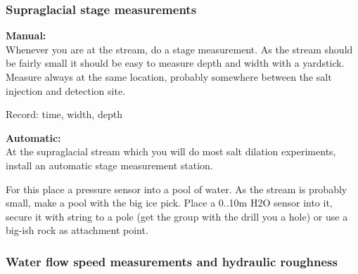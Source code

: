 \documentclass[DIV=15,halfparskip,11pt,headinclude]{scrartcl}
\begin{document}
\subsubsection{Supraglacial stage measurements}

\textbf{Manual:\\}
Whenever you are at the stream, do a stage measurement.  As the stream
should be fairly small it should be easy to measure depth and width
with a yardstick.  Measure always at the same location, probably
somewhere between the salt injection and detection site.

Record: time, width, depth

\textbf{Automatic:}\\
At the supraglacial stream which you will do most salt dilation
experiments, install an automatic stage measurement station.




For this place a pressure sensor into a pool of water.  As the stream
is probably small, make a pool with the big ice pick.  Place a 0..10m
H2O sensor into it, secure it with string to a pole (get the group
with the drill you a hole) or use a big-ish rock as attachment point.

\subsubsection{Water flow speed measurements and hydraulic roughness}
\end{document}
